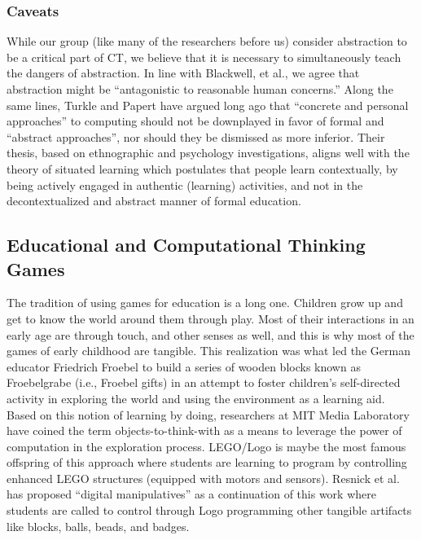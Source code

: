 \documentclass{acm_proc_article-sp}
\begin{document}
\subsubsection{Caveats}
While our group (like many of the researchers before us) consider abstraction to be a critical part of CT, we believe that it is necessary to simultaneously teach the dangers of abstraction. In line with Blackwell, et al., we agree that abstraction might be “antagonistic to reasonable human concerns.” Along the same lines, Turkle and Papert have argued long ago that “concrete and personal approaches” to computing should not be downplayed in favor of formal and “abstract approaches”, nor should they be dismissed as more inferior. Their thesis, based on ethnographic and psychology investigations, aligns well with the theory of situated learning which postulates that people learn contextually, by being actively engaged in authentic (learning) activities, and not in the decontextualized and abstract manner of formal education.

\subsection{Educational and Computational Thinking Games}
The tradition of using games for education is a long one. Children grow up and get to know the world around them through play. Most of their interactions in an early age are through touch, and other senses as well, and this is why most of the games of early childhood are tangible. This realization was what led the German educator Friedrich Froebel to build a series of wooden blocks known as Froebelgrabe (i.e., Froebel gifts) in an attempt to foster children’s self-directed activity in exploring the world and using the environment as a learning aid. Based on this notion of learning by doing, researchers at MIT Media Laboratory have coined the term objects-to-think-with as a means to leverage the power of computation in the exploration process. LEGO/Logo is maybe the most famous offspring of this approach where students are learning to program by controlling enhanced LEGO structures (equipped with motors and sensors). Resnick et al. has proposed “digital manipulatives” as a continuation of this work where students are called to control through Logo programming other tangible artifacts like blocks, balls, beads, and badges.
\end{document}
